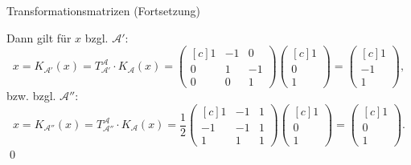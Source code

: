 \documentclass[german]{../spicker}
\newcommand{\vektor}[1]{\begin{pmatrix*}[c] #1 \end{pmatrix*}}
\begin{document}
\begin{example}{Transformationsmatrizen (Fortsetzung)}
\begin{enumerate}[a)]
              Dann gilt für $x$ bzgl. $\mathcal{A}'$:
              $$
                  x = K_{\mathcal{A}'}(x) = T^{\mathcal{A}}_{\mathcal{A}'} \cdot K_{\mathcal{A}}(x) = \vektor{1 & -1 & 0 \\ 0 & 1 & -1 \\ 0 & 0 & 1} \vektor{1 \\ 0 \\ 1} = \vektor{1 \\ -1 \\ 1},
              $$
              bzw. bzgl. $\mathcal{A}''$:
              $$
                  x = K_{\mathcal{A}''}(x) = T^{\mathcal{A}}_{\mathcal{A}''} \cdot K_{\mathcal{A}}(x) = \frac{1}{2}\vektor{1 & -1 & 1 \\ -1 & -1 & 1 \\ 1 & 1 & 1} \vektor{1 \\ 0 \\ 1} = \vektor{1 \\ 0 \\ 1}.
              $$\qed
    \end{enumerate}
\end{example}
\end{document}
